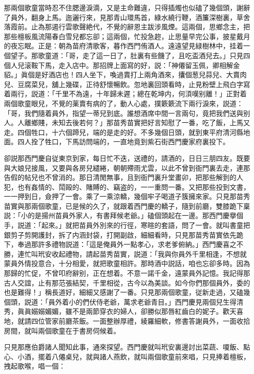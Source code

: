 那兩個歌童當時忍不住腮邊淚滴，又是主命難違，只得插燭也似磕了幾個頭，謝辭了員外，翻身上馬。迤邐行來，見那青山環馬首，綠水繞行鞭，酒簾深樹裏，草舍落霞前。止為那遏行雲歌聲絶代，不覺的辭恩主跋涉風煙。這兩個，思鄉念主，把那些檀板風流陽春白雪兒都忘卻；這兩個，忙投急趂，止思量早完公事，披星戴月的夜忘眠。正是：朝為苗府清歌客，暮作西門侑酒人。遠遠望見緑樹林中，挂着一個望子。那歌童道：「哥，走了這一日了，肚裏有些饑了，且吃盃酒兒去。」只見四個人兒滚鞍下馬，走入店中。那招牌上面寫的好，説：「神僊留玉佩，卿相解金貂。」眞個是好酒店也！四人坐下，喚過賣打上兩角酒來，攮個葱兒蒜兒、大賣肉兒、豆腐菜兒，舖上幾碟，正待舒懷暢飲。忽地裏回頭看時，止見粉壁上飛白字寫着兩行，説道：「千里不為遠，十年歸未遲；總在乾坤内，何湏嘆别離！」正對着兩個歌童眼兒，不覺的薬賣有病的了，動人心處，撲簌簌流下兩行淚來，説道：「哥，我們隨着員外，指望一蒂兒到底。誰想酒席中間一言兩句，竟把我們送與别人。人離鄉賤，未知去後若何？」那苗秀苗實把好言知慰了一番，吃了飯，上馬又走。四個牲口，十六個蹄兒，端的是走的好。不多幾個日頭，就到東平府清河縣地面。四人拴了牲口，下馬訪問端的，一直地竟到紫石街西門慶家府裏投下。

卻説那西門慶自従東京到家，每日忙不迭，送禮的，請酒的，日日三朋四友。既要與大娘兒接風，又要與各房兒繾綣，朝朝殢雨尤雲，以此不曾到衙門裏去走，連那告假的帖兒也不曾消的。那日清閒無事，且到衙門裏升堂畫卯，把那些解到的人犯，也有姦情的、鬦毆的、賭賻的、竊盗的，一一重問一番。又把那些投到文書，一一押到日，僉押了一會。乘了一乘涼轎，幾個牢子喝道子簇擁來家。只見那苗秀苗實與那兩個歌童，已是候的久了，就跟着西門慶的轎子，隨到前廳，雙膝跪下稟説：「小的是揚州苗員外家人，有書拜候老爺。」磕個頭起在一邊。那西門慶擧個手，説道：「起來。」就把苗員外別來的行徑，寒暄的套語，問了一會。就叫書童把銀剪子剪開護封，拆了内涵封袋，打開副啟，細細看時，只見那苗秀苗實依先跪下，奉過那許多禮物説道：「這是俺員外一點孝心，求老爹俯納。」西門慶喜之不勝，連忙叫玳安收起禮物，請起苗秀苗實，説道：「我與你員外千里相逢，不想就蒙員外情投意合，十分相愛，就把歌童相許。那時酒中説話，咱也忘卻多時。因為那歸的忙促，不曾叩府辭别，正在想着。不意一諾千金，遠蒙員外記憶。我記得那古人交誼，止有那范張結契，千里相從，古今以為美談。如今你們那個員外，委的也是難得！」稱長道好，細細又感謝了一番。只見那兩個歌童，従新走過，又磕幾個頭，説道：「員外着小的們伏侍老爺，萬求老爺青目。」西門慶見兩個兒生得清秀，眞眞嫋嫋媚媚，雖不是兩節穿衣的婦人，卻勝似那唇紅齒白的妮子。歡天喜地，就請四位管家前廳茶飯。一面整辦厚禮，綾羅細軟，修書答謝員外，一面收拾房間，就叫兩個歌童在于書房伺候着。

只見那應伯爵諸人聞知此事，通來探望。西門慶就叫玳安裏邊討出菜蔬、嗄飯、點心、小酒，擺着八僊桌兒，就與諸人燕飲，就叫兩個歌童前來唱，只見捧着檀板，拽起歌喉，唱一個：

